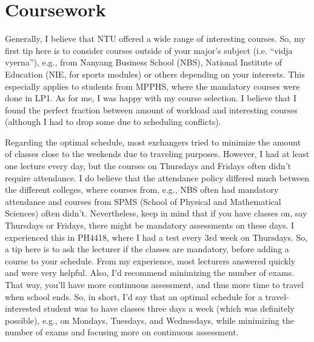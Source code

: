 \chapter*{Coursework}
\vspace{-0.15cm}
Generally, I believe that NTU offered a wide range of interesting courses. So, my first tip here is to consider courses outside of your major's subject (i.e. ``vidja vyerna''), e.g., from Nanyang Business School (NBS), National Institute of Education (NIE, for sports modules) or others depending on your interests. This especially applies to students from MPPHS, where the mandatory courses were done in LP1. As for me, I was happy with my course selection. I believe that I found the perfect fraction between amount of workload and interesting courses (although I had to drop some due to scheduling conflicts).

Regarding the optimal schedule, most exchangers tried to minimize the amount of classes close to the weekends due to traveling purposes. However, I had at least one lecture every day, but the courses on Thursdays and Fridays often didn't require attendance. I do believe that the attendance policy differed much between the different colleges, where courses from, e.g., NBS often had mandatory attendance and courses from SPMS (School of Physical and Mathematical Sciences) often didn't. Nevertheless, keep in mind that if you have classes on, say Thursdays or Fridays, there might be mandatory assessments on these days. I experienced this in PH4418, where I had a test every 3rd week on Thursdays. So, a tip here is to ask the lecturer if the classes are mandatory, before adding a course to your schedule. From my experience, most lecturers answered quickly and were very helpful. Also, I'd recommend minimizing the number of exams. That way, you'll have more continuous assessment, and thus more time to travel when school ends. So, in short, I'd say that an optimal schedule for a travel-interested student was to have classes three days a week (which was definitely possible), e.g., on Mondays, Tuesdays, and Wednesdays, while minimizing the number of exams and focusing more on continuous assessment.

